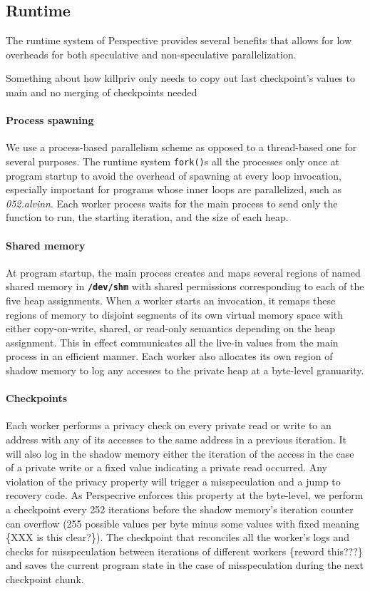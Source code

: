 \subsection{Runtime}

The runtime system of Perspective provides several benefits that allows for
low overheads for both speculative and non-speculative parallelization.

Something about how killpriv only needs to copy out last checkpoint's
values to main and no merging of checkpoints needed
\paragraph{Process spawning}
We use a process-based parallelism scheme as opposed to a thread-based one
for several purposes. The runtime system \texttt{fork()}s all the processes
only once at program startup to avoid the overhead of spawning at every loop
invocation, especially important for programs whose inner loops are
parallelized, such as \textit{052.alvinn}. Each worker process waits for the main
process to send only the function to run, the starting iteration, and the
size of each heap.

\paragraph{Shared memory}
At program startup, the main process creates and maps several regions of named shared
memory in \texttt{\textbf{/dev/shm}} with shared permissions corresponding
to each of the five heap assignments.
When a worker starts an invocation, it remaps these regions of memory to
disjoint segments of its own virtual memory space with either
copy-on-write, shared, or read-only semantics depending on the heap
assignment. This in effect communicates all the live-in values from the
main process in an efficient manner. Each worker also allocates its own
region of shadow memory to log any accesses to the private heap at a
byte-level granuarity.

\paragraph{Checkpoints}
Each worker performs a privacy check on every private read or write to an
address with any of its accesses to the same address in a previous
iteration. It will also log in the shadow memory either the iteration of the
access in the case of a private write or a fixed value indicating a
private read occurred. Any violation of the privacy property will trigger a
misspeculation and a jump to recovery code. As Perspecrive enforces this
property at the byte-level, we perform a checkpoint every 252 iterations
before the shadow memory's iteration counter can overflow (255 possible
values per byte minus some values with fixed meaning \{XXX is this
clear?\}). The checkpoint that reconciles all the worker's logs and checks for
misspeculation between iterations of different workers \{reword this???\} and
saves the current program state in the case of misspeculation during the
next checkpoint chunk.

